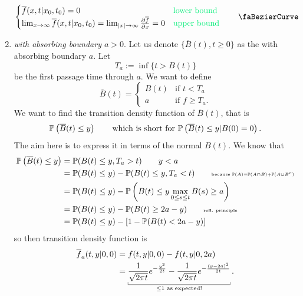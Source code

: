 \documentclass[12pt]{report}
\begin{document}
\begin{enumerate}
\begin{equation*}
\begin{cases}
			\overline{f}(x,t|x_{0},t_{0})=0&\text{\textcolor{SpringGreen2}{lower bound}}\\
			\lim_{x\to\infty}\overline{f}(x,t|x_{0},t_{0})=\lim_{|x|\to\infty}\frac{\partial \overline{f}}{\partial x}=0&\text{\textcolor{SpringGreen2}{upper bound}}
		\end{cases}\tag*{\faBezierCurve}\label{bezier}
	\end{equation*}
	\item \textit{\bwm{} with absorbing boundary $a>0$}. Let us denote $\{\overline{B}(t),t\geq0\}$ as the \bwm{} with absorbing boundary $a$. Let
	\begin{equation*}
		T_{a}:=\inf\{t>B(t)\}
	\end{equation*}
	be the first passage time through $a$. We want to define
	\begin{equation*}
		\overline{B}(t)=\begin{cases}
			B(t)&\text{if }t<T_{a}\\
			a&\text{if }f\geq T_{a}.
		\end{cases}
	\end{equation*}
	We want to find the transition density function of $\overline{B}(t)$, that is
	\begin{equation*}
		\mathbb{P}\left(\overline{B}(t)\leq y\right)\qquad\text{which is short for }\mathbb{P}\left(\overline{B}(t)\leq y|B(0)=0\right).
	\end{equation*}
	The aim here is to express it in terms of the normal \bwm{} $B(t)$. We know that
	\begin{align*}
		\mathbb{P}\left(\overline{B}(t)\leq y\right)&=\mathbb{P}(B(t)\leq y,T_{a}>t)\qquad y<a\\
		&=\mathbb{P}(B(t)\leq y)-\mathbb{P}(B(t)\leq y, T_{a}<t)\scriptscriptstyle\qquad\text{because }\mathbb{P}(A)=\mathbb{P}(A\cap B)+\mathbb{P}(A\cup B^{c})\\
		&=\mathbb{P}(B(t)\leq y)-\mathbb{P}\left(B(t)\leq y\max_{0\leq s\leq t}B(s)\geq a\right)\\
		&=\mathbb{P}(B(t)\leq y)-\mathbb{P}(B(t)\geq 2a-y)\qquad\scriptscriptstyle\text{refl. principle}\\
		&=\mathbb{P}(B(t)\leq y)-[1-\mathbb{P}(B(t)<2a-y)]
	\end{align*}
	so then transition density function is
	\begin{align*}
		\overline{f}_{a}(t,y|0,0)&=f(t,y|0,0)-f(t,y|0,2a)\\
		&=\ubracketthin{\frac{1}{\sqrt{2\pi t}}e^{-\frac{y^{2}}{2t}}-\frac{1}{\sqrt{2\pi t}}e^{-\frac{(y-2a)^{2}}{2t}}}_{\leq 1\text{ as expected!}}.
	\end{align*}

\end{enumerate}
\end{document}
